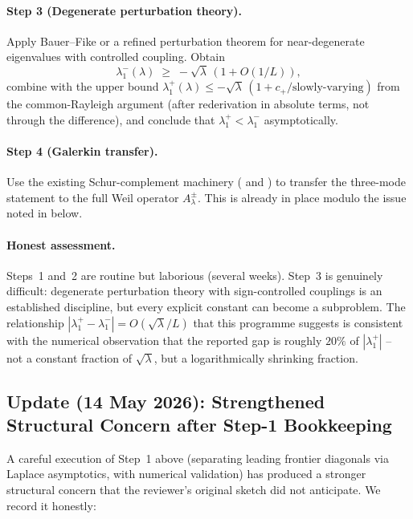 \documentclass[11pt,a4paper]{article}
\theoremstyle{remark}
\theoremstyle{plain}
\begin{document}
\paragraph{Step 3 (Degenerate perturbation theory).} Apply Bauer--Fike or a
refined perturbation theorem for near-degenerate eigenvalues with controlled
coupling. Obtain
\[
  \lambda_1^-(\lambda) \;\geq\; -\sqrt\lambda\,(1 + O(1/L)),
\]
combine with the upper bound
$\lambda_1^+(\lambda)\leq -\sqrt\lambda\,(1 + c_+/\text{slowly-varying})$ from
the common-Rayleigh argument (after rederivation in absolute terms, not
through the difference), and conclude that
$\lambda_1^+<\lambda_1^-$ asymptotically.

\paragraph{Step 4 (Galerkin transfer).} Use the existing Schur-complement
machinery ( and ) to transfer the
three-mode statement to the full Weil operator $A_\lambda^\pm$. This is
already in place modulo the issue noted in
 below.

\paragraph{Honest assessment.} Steps~1 and~2 are routine but laborious
(several weeks). Step~3 is genuinely difficult: degenerate perturbation theory
with sign-controlled couplings is an established discipline, but every
explicit constant can become a subproblem. The relationship
$|\lambda_1^+-\lambda_1^-|=O(\sqrt\lambda/L)$ that this programme suggests is
consistent with the numerical observation that the reported gap is roughly
$20\%$ of $|\lambda_1^+|$ -- not a constant fraction of $\sqrt\lambda$, but a
logarithmically shrinking fraction.

\subsection{Update (14 May 2026): Strengthened Structural Concern after
            Step-1 Bookkeeping}
\label{sec:k0-strengthened}

A careful execution of Step~1 above (separating leading frontier
diagonals via Laplace asymptotics, with numerical validation) has
produced a stronger structural concern that the reviewer's original
sketch did not anticipate. We record it honestly:
\end{document}
